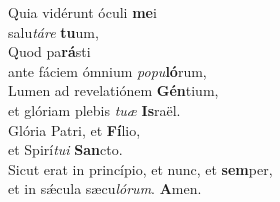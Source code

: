 \evenverse Quia vidérunt óculi \textbf{me}i~\*\\
\evenverse salu\textit{tá}\textit{re} \textbf{tu}um,\\
\oddverse Quod pa\textbf{rá}sti~\*\\
\oddverse ante fáciem ómnium \textit{po}\textit{pu}\textbf{ló}rum,\\
\evenverse Lumen ad revelatiónem \textbf{Gén}tium,~\*\\
\evenverse et glóriam plebis \textit{tu}\textit{æ} \textbf{Is}raël.\\
\oddverse Glória Patri, et \textbf{Fí}lio,~\*\\
\oddverse et Spirí\textit{tu}\textit{i} \textbf{San}cto.\\
\evenverse Sicut erat in princípio, et nunc, et \textbf{sem}per,~\*\\
\evenverse et in sǽcula sæcu\textit{ló}\textit{rum}. \textbf{A}men.\\
